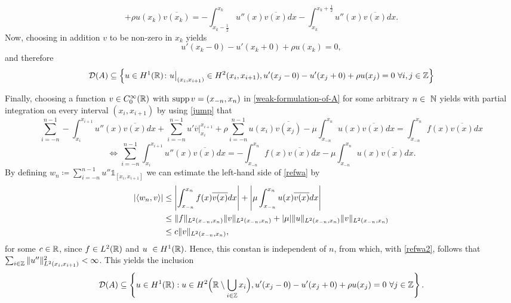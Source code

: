 	\[ +  \rho u(x_{k})\overline{v(x_{k})} = - \int_{x_{k} - \frac{1}{2}}^{x_{k}} u''(x) \overline{v(x)} dx - \int_{x_{k}}^{x_{k} + \frac{1}{2}} u''(x) \overline{v(x)} dx. \]
Now, choosing in addition $v$ to be non-zero in $x_{k}$ yields 
	\begin{equation}
		u'(x_{k}-0) - u'(x_{k}+0) + \rho u(x_{k}) = 0, \label{jump}
	\end{equation} 
and therefore
	\begin{equation}
		\mathcal{D}(A) \subseteq \Big\{ u \in H^{1}(\mathbb{R}) \colon u\big|_{(x_{i}, x_{i+1})} \in H^{2}(x_{i}, x_{i+1}), u'(x_{j} - 0) - u'(x_{j} + 0) + \rho u(x_{j}) = 0 ~\forall i, j \in \mathbb{Z} \Big\}
	\end{equation} 
	
Finally, choosing a function $v \in C_{0}^{\infty}(\mathbb{R})$ with $\operatorname{supp} v = (x_{-n}, x_{n})$ in \eqref{weak-formulation-of-A} for some arbitrary $n \in \N$ yields with partial integration on every interval $(x_{i}, x_{i+1})$ by using \eqref{jump} that
\[ \sum_{i=-n}^{n-1} -\int_{x_{i}}^{x_{i+1}} u''(x) \overline{v(x)} dx + \sum_{i=-n}^{n-1} u' \overline{v} \big|_{x_{i}}^{x_{i+1}} + \rho \sum_{i=-n}^{n-1} u(x_{i}) \overline{v(x_{j})} - \mu \int_{x_{-n}}^{x_{n}} u(x) \overline{v(x)} dx = \int_{x_{-n}}^{x_{n}} f(x) \overline{v(x)} dx \]
\begin{equation}
	\iff \sum_{i=-n}^{n-1} \int_{x_{i}}^{x_{i+1}} u''(x) \overline{v(x)} dx = - \int_{x_{-n}}^{x_{n}} f(x) \overline{v(x)} dx - \mu \int_{x_{-n}}^{x_{n}} u(x) \overline{v(x)} dx. \label{refwa}
\end{equation} 
By defining $w_{n} \coloneqq \sum_{i=-n}^{n-1} u'' \mathds{1}_{[x_{i}, x_{i+1}]}$ we can estimate the left-hand side of \eqref{refwa} by
\begin{align}
	\left| \langle w_{n}, v \rangle \right| & \leq \left| \int_{x_{-n}}^{x_{n}} f(x) \overline{v(x)} dx \right| + \left| \mu \int_{x_{-n}}^{x_{n}} u(x) \overline{v(x)} dx \right|  \notag \\
		& \leq \|f\|_{L^{2}(x_{-n}, x_{n})} \|v\|_{L^{2}(x_{-n}, x_{n})} + |\mu| \|u\|_{L^{2}(x_{-n}, x_{n})} \|v\|_{L^{2}(x_{-n}, x_{n})} \notag \\
		& \leq c \|v\|_{L^{2}(x_{-n}, x_{n})}, \label{refwa2}
\end{align}
for some $c \in \mathbb{R}$, since $f \in L^{2}(\mathbb{R})$ and $u \in H^{1}(\R)$. Hence, this constan is independent of $n$, from which, with \eqref{refwa2}, follows that $\sum_{i \in \mathbb{Z}} \|u''\|^{2}_{L^{2}(x_{i}, x_{i+1})} < \infty$. This yields the inclusion
	\begin{equation}
		\mathcal{D}(A) \subseteq \left\{ u \in H^{1}(\mathbb{R}): u \in H^{2}\Big(\mathbb{R} \setminus \bigcup_{i \in \mathbb{Z}} x_{i} \Big), u'(x_{j} - 0) - u'(x_{j} + 0) + \rho u(x_{j}) = 0 ~\forall j \in \mathbb{Z} \right\}. \label{firstdomaininclusion} 
	\end{equation}
